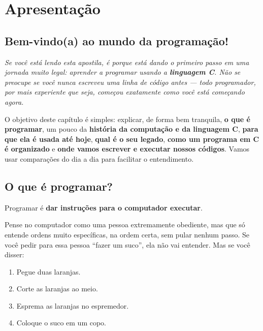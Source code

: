 \chapter{Apresentação}

\section*{\textcolor{azulPrincipal}{\faRocket} Bem-vindo(a) ao mundo da programação!}

\begin{destacado}
\textit{Se você está lendo esta apostila, é porque está dando o primeiro passo em uma jornada muito legal: aprender a programar usando a \textbf{linguagem C}. Não se preocupe se você nunca escreveu uma linha de código antes --- todo programador, por mais experiente que seja, começou exatamente como você está começando agora.}
\end{destacado}

\vspace{0.5cm}

O objetivo deste capítulo é simples: explicar, de forma bem tranquila, \textbf{o que é programar}, um pouco da \textbf{história da computação e da linguagem C}, \textbf{para que ela é usada até hoje}, \textbf{qual é o seu legado}, \textbf{como um programa em C é organizado} e \textbf{onde vamos escrever e executar nossos códigos}. Vamos usar comparações do dia a dia para facilitar o entendimento.

\section{\textcolor{azulPrincipal}{O que é programar?}}

Programar é \textbf{\textcolor{laranja}{dar instruções para o computador executar}}.

\begin{importante}
Pense no computador como uma pessoa extremamente obediente, mas que só entende ordens muito específicas, na ordem certa, sem pular nenhum passo. Se você pedir para essa pessoa ``fazer um suco'', ela não vai entender. Mas se você disser:
\end{importante}

\begin{enumerate}
    \item Pegue duas laranjas.
    \item Corte as laranjas ao meio.
    \item Esprema as laranjas no espremedor.
    \item Coloque o suco em um copo.
\end{enumerate}

